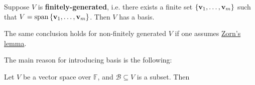 \begin{corollary} \label{cor:fghasbasis}
Suppose \(V\) is {\bf finitely-generated}, i.e. there exists a finite set $\{{\bf v}_1,\ldots ,{\bf v}_{m}\}$ such that $V = \operatorname{span}\left\{{\bf v}_1,\ldots ,{\bf v}_{m}\right\}$.
Then \(V\) has a basis. 
\end{corollary}
The same conclusion holds for non-finitely generated \(V\) if one assumes \href{https://en.wikipedia.org/wiki/Zorn%27s_lemma}{Zorn's lemma}.


The main reason for introducing basis is the following:
\begin{theorem} \label{thm-uniquesum}
    Let $V$ be a vector space over $\mathbb{F}$, and $\mathcal{B} \subseteq V$ is a subset. Then 
    \begin{center}
    \end{center}
\end{theorem}
